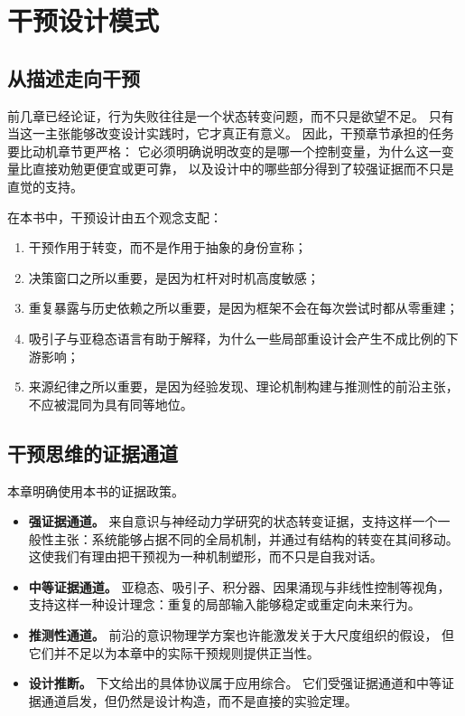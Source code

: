 \chapter{干预设计模式}
\label{ch:interventions}

\section{从描述走向干预}

前几章已经论证，行为失败往往是一个状态转变问题，而不只是欲望不足。
只有当这一主张能够改变设计实践时，它才真正有意义。
因此，干预章节承担的任务要比动机章节更严格：
它必须明确说明改变的是哪一个控制变量，为什么这一变量比直接劝勉更便宜或更可靠，
以及设计中的哪些部分得到了较强证据而不只是直觉的支持。

在本书中，干预设计由五个观念支配：
\begin{enumerate}[nosep]
  \item 干预作用于转变，而不是作用于抽象的身份宣称；
  \item 决策窗口之所以重要，是因为杠杆对时机高度敏感；
  \item 重复暴露与历史依赖之所以重要，是因为框架不会在每次尝试时都从零重建；
  \item 吸引子与亚稳态语言有助于解释，为什么一些局部重设计会产生不成比例的下游影响；
  \item 来源纪律之所以重要，是因为经验发现、理论机制构建与推测性的前沿主张，不应被混同为具有同等地位。
\end{enumerate}

\section{干预思维的证据通道}

本章明确使用本书的证据政策。

\begin{itemize}[nosep]
  \item \textbf{强证据通道。} 来自意识与神经动力学研究的状态转变证据，支持这样一个一般性主张：系统能够占据不同的全局机制，并通过有结构的转变在其间移动。
        这使我们有理由把干预视为一种机制塑形，而不只是自我对话。
  \item \textbf{中等证据通道。} 亚稳态、吸引子、积分器、因果涌现与非线性控制等视角，支持这样一种设计理念：重复的局部输入能够稳定或重定向未来行为。
  \item \textbf{推测性通道。} 前沿的意识物理学方案也许能激发关于大尺度组织的假设，
        但它们并不足以为本章中的实际干预规则提供正当性。
  \item \textbf{设计推断。} 下文给出的具体协议属于应用综合。
        它们受强证据通道和中等证据通道启发，但仍然是设计构造，而不是直接的实验定理。
\end{itemize}

